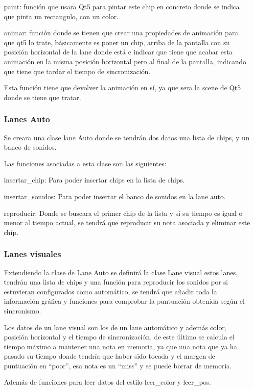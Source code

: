 \documentclass[a4paper,11pt,oneside]{book}
\begin{document}
paint: función que usara Qt5 para pintar este chip en concreto donde se indica que pinta un rectangulo, con un color.

animar: función donde se tienen que crear una propiedades de animación para que qt5 lo trate, básicamente es poner un chip, arriba de la pantalla con su posición horizontal de la lane donde está e indicar que tiene que acabar esta animación en la misma posición horizontal pero al final de la pantalla, indicando que tiene que tardar el tiempo de sincronización.

Esta función tiene que devolver la animación en sí, ya que sera la scene de Qt5 donde se tiene que tratar.

\subsubsection{Lanes Auto}
Se creara una clase lane Auto donde se tendrán dos datos una lista de chips, y un banco de sonidos.

Las funciones asociadas a esta clase son las siguientes:

insertar\_chip: Para poder insertar chips en la lista de chips.

insertar\_sonidos: Para poder insertar el banco de sonidos en la lane auto.

reproducir: Donde se buscara el primer chip de la lista y si su tiempo es igual o menor al tiempo actual, se tendrá que reproducir su nota asociada y eliminar este chip.

\subsubsection{Lanes visuales}
Extendiendo la clase de Lane Auto se definirá la clase Lane visual estos lanes, tendrán una lista de chips y una función para reproducir los sonidos por si estuvieran configurados como automático, se tendrá que añadir toda la información gráfica y funciones para comprobar la puntuación obtenida según el sincronismo.

Los datos de un lane visual son los de un lane automático y además color, posición horizontal y el tiempo de sincronización, de este último se calcula el tiempo máximo a mantener una nota en memoria, ya que una nota que ya ha pasado su tiempo donde tendría que haber sido tocada y el margen de puntuación en ``poor'', esa nota es un  ``miss'' y se puede borrar de memoria.


Además de funciones para leer datos del estilo leer\_color y leer\_pos.
\end{document}
